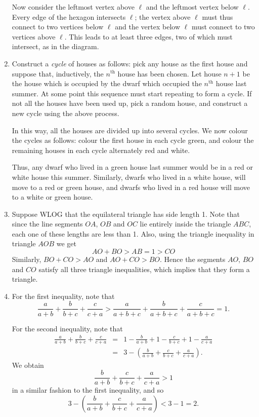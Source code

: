 \documentclass{article}
\begin{document}
\begin{enumerate}
Now consider the leftmost vertex above $\ell$ and the leftmost vertex below $\ell$. Every edge of the hexagon intersects $\ell$; the vertex above $\ell$ must thus connect to two vertices below $\ell$ and the vertex below $\ell$ must connect to two vertices above $\ell$. This leads to at least three edges, two of which must intersect, as in the diagram.

\centerline{}

\item Construct a \emph{cycle} of houses as follows: pick any house as the first house and suppose that, inductively, the $n^{\textrm{th}}$ house has been chosen. Let house $n+1$ be the house which is occupied by the dwarf which occupied the $n^{\textrm{th}}$ house last summer. At some point this sequence must start repeating to form a cycle. If not all the houses have been used up, pick a random house, and construct a new cycle using the above process. 

In this way, all the houses are divided up into several cycles. We now colour the cycles as follows: colour the first house in each cycle green, and colour the remaining houses in each cycle alternately red and white. 

Thus, any dwarf who lived in a green house last summer would be in a red or white house this summer. Similarly, dwarfs who lived in a white house, will move to a red or green house, and dwarfs who lived in a red house will move to a white or green house. 

\item Suppose WLOG that the equilateral triangle has side length 1. Note that since the line segments $OA$, $OB$ and $OC$ lie entirely inside the triangle $ABC$, each one of these lengths are less than 1. Also, using the triangle inequality in triangle $AOB$ we get 
$$AO+BO > AB = 1 > CO$$
Similarly, $BO + CO > AO$ and $AO+CO > BO$. Hence the segments $AO$, $BO$ and $CO$ satisfy all three triangle inequalities, which implies that they form a triangle.

\centerline{}

\item For the first inequality, note that 
$$\frac{a}{a+b} + \frac{b}{b+c} + \frac{c}{c+a} > \frac{a}{a+b+c} + \frac{b}{a+b+c}+\frac{c}{a+b+c}=1.$$

For the second inequality, note that 
\begin{eqnarray*}
\frac{a}{a+b} + \frac{b}{b+c} + \frac{c}{c+a} &=& 1-\frac{b}{a+b} + 1-\frac{c}{b+c} + 1-\frac{a}{c+a} \\
&=& 3-\left(\frac{b}{a+b} + \frac{c}{b+c} + \frac{a}{c+a}\right).
\end{eqnarray*}
We obtain 
$$\frac{b}{a+b} + \frac{c}{b+c} + \frac{a}{c+a} > 1$$ in a similar fashion to the first inequality, and so 
$$3-\left(\frac{b}{a+b} + \frac{c}{b+c} + \frac{a}{c+a}\right) < 3-1 = 2.$$

\end{enumerate}
\end{document}
